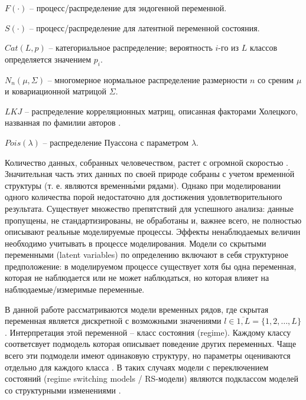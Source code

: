 \documentclass[a4paper,14pt]{extreport}
\begin{document}
$F(\cdot)$ -- процесс/распределение для эндогенной переменной.

$S(\cdot)$ -- процесс/распределение для латентной переменной состояния.

$\mathit{Cat}(L, p)$ -- категориальное распределение; вероятность $i$-го из $L$ классов определяется значением $p_i$.

$N_n(\mu, \Sigma)$ -- многомерное нормальное распределение размерности $n$ со среним $\mu$ и ковариационной матрицой $\Sigma$.

$\mathit{LKJ}$ -- распределение корреляционных матриц, описанная факторами Холецкого, названная по фамилии авторов \cite{lkj_prior}. 

$\mathit{Pois}(\lambda)$ -- распределение Пуассона с параметром $\lambda$.




Количество данных, собранных человечеством, растет с огромной скоростью \cite{idc_data_2025}. Значительная часть этих данных по своей природе собраны с учетом временн\'{о}й структуры (т. е. являются временн\'{ы}ми рядами). Однако при моделировании одного количества порой недостаточно для достижения удовлетворительного результата. Существует множество препятствий для успешного анализа: данные пропущены, не стандартизированы, не обработаны и, важнее всего, не полностью описывают реальные моделируемые процессы. Эффекты ненаблюдаемых величин необходимо учитывать в процессе моделирования. Модели со скрытыми переменными (latent variables) по определению включают в себя структурное предположение: в моделируемом процессе существует хотя бы одна переменная, которая не наблюдается или не может наблюдаться, но которая влияет на наблюдаемые/измеримые переменные.

В данной работе рассматриваются модели временных рядов, где скрытая переменная является дискретной с возможными значениями $l \in \overline{1,L} = \{1,2,\dots,L\}$. Интерпретация этой переменной -- класс состояния (regime). Каждому классу соответсвует подмодель которая описывает поведение других переменных. Чаще всего эти подмодели имеют одинаковую структуру, но параметры оцениваются отдельно для каждого класса . В таких случаях модели с переключением состояний (regime switching models / RS-модели) являются подклассом моделей со структурными изменениями \cite{mal_multidim_nonhomogenous}.
\end{document}

